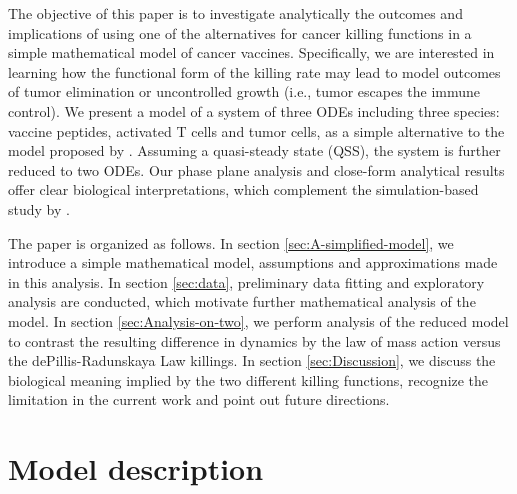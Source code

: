 \documentclass[review,authoryear]{elsarticle}
\begin{document}
The objective of this paper is to investigate analytically the outcomes
and implications of using one of the alternatives for cancer killing functions in a simple mathematical
model of cancer vaccines. Specifically, we are interested in learning
how the functional form of the killing rate may lead to model outcomes of tumor elimination
or uncontrolled growth (i.e., tumor escapes the immune control). We present
a model of a system of three ODEs
including three species: vaccine peptides, activated T cells and tumor
cells, as a simple alternative to the model proposed by \citet{Messan2021}. Assuming a quasi-steady state (QSS), the system is further reduced
to two ODEs. Our phase plane analysis and close-form analytical
results offer clear biological interpretations, which complement
the simulation-based study by \citet{Messan2021}. 

The paper is organized as follows. In section \ref{sec:A-simplified-model},
we introduce a simple mathematical model, assumptions and approximations made in this analysis. In section \ref{sec:data}, preliminary data fitting and exploratory analysis are conducted, which motivate further mathematical analysis of the model. In section \ref{sec:Analysis-on-two},
we perform analysis of the reduced model to contrast the resulting
difference in dynamics by the law of mass action versus the dePillis-Radunskaya
Law killings. In section \ref{sec:Discussion}, we discuss the biological
meaning implied by the two different killing functions, recognize the
limitation in the current work and point out future directions. 



\section{Model description \label{sec:A-simplified-model}}
\end{document}
